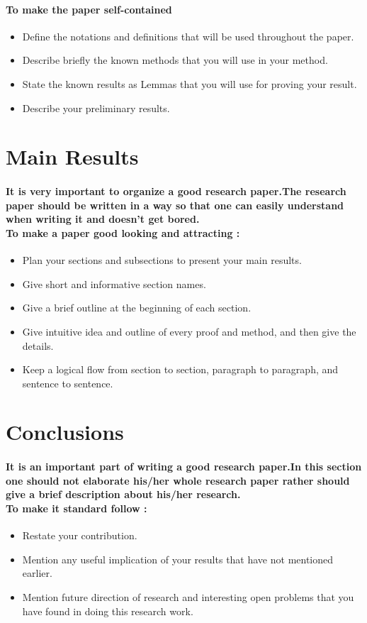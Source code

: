 \documentclass[20pt]{report}
\begin{document}
\paragraph{To make the paper self-contained}
\begin{itemize}
\item Define the notations and definitions that will be used
throughout the paper.
\item Describe briefly the known methods that you will use in
your method.
\item State the known results as Lemmas that you will use for
proving your result.
\item Describe your preliminary results.
\end{itemize}

\section{Main Results}
\paragraph{It is very important to organize a good research paper.The research paper should be written in a way so that one can easily understand when writing it and doesn't get bored.\\To make a paper good looking and attracting :}
\begin{itemize}
\item Plan your sections and subsections to present your main
results.
\item Give short and informative section names.
\item Give a brief outline at the beginning of each section.
\item Give intuitive idea and outline of every proof and method,
and then give the details.
\item Keep a logical flow from section to section, paragraph to
paragraph, and sentence to sentence.
\end{itemize}

\section{Conclusions}
\paragraph{It is an important part of writing a good research paper.In this section one should not elaborate his/her whole research paper rather should give a brief description about his/her research.\\To make it standard follow :}
\begin{itemize}
\item Restate your contribution.
\item Mention any useful implication of your results that have not
mentioned earlier.
\item Mention future direction of research and interesting open
problems that you have found in doing this research work.
\end{itemize}
\end{document}
